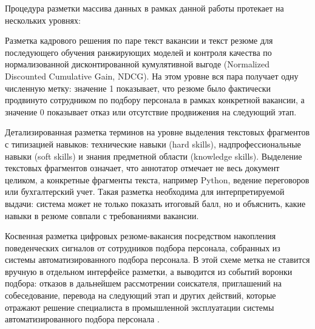 Процедура разметки массива данных в рамках данной работы протекает на нескольких уровнях:

\begin{compactenum}

  \item Разметка кадрового решения по паре текст вакансии и текст резюме для последующего обучения ранжирующих моделей и контроля качества по нормализованной дисконтированной кумулятивной выгоде (Normalized Discounted Cumulative Gain, NDCG). На этом уровне вся пара получает одну численную метку: значение 1 показывает, что резюме было фактически продвинуто сотрудником по подбору персонала в рамках конкретной вакансии, а значение 0 показывает отказ или отсутствие продвижения на следующий этап.

  \item Детализированная разметка терминов на уровне выделения текстовых фрагментов с типизацией навыков: технические навыки (hard skills), надпрофессиональные навыки (soft skills) и знания предметной области (knowledge skills). Выделение текстовых фрагментов означает, что аннотатор отмечает не весь документ целиком, а конкретные фрагменты текста, например Python, ведение переговоров или бухгалтерский учет. Такая разметка необходима для интерпретируемой выдачи: система может не только показать итоговый балл, но и объяснить, какие навыки в резюме совпали с требованиями вакансии.

  \item Косвенная разметка цифровых резюме-вакансия посредством накопления поведенческих сигналов от сотрудников подбора персонала, собранных из системы автоматизированного подбора персонала. В этой схеме метка не ставится вручную в отдельном интерфейсе разметки, а выводится из событий воронки подбора: отказов в дальнейшем рассмотрении соискателя, приглашений на собеседование, перевода на следующий этап и других действий, которые отражают решение специалиста в промышленной эксплуатации системы автоматизированного подбора персонала \cite{src41, src42}.

\end{compactenum}

